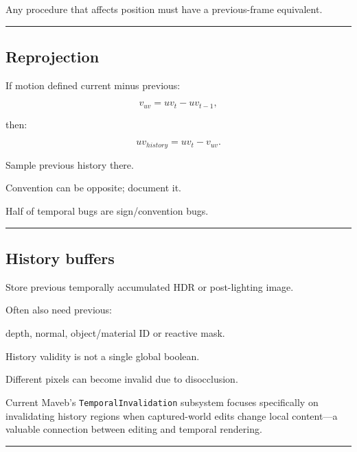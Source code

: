 Any procedure that affects position must have a previous-frame equivalent.

\begin{center}\rule{0.5\linewidth}{0.5pt}\end{center}

\subsection{Reprojection}\label{04-visual-computing-ii-ch040-reprojection}

\hypertarget{04-visual-computing-ii-ch040-reprojection}{}

If motion defined current minus previous:

\[
v_{uv}
=
uv_t-uv_{t-1},
\]

then:

\[
\boxed{
uv_{history}
=
uv_t-v_{uv}.
}
\]

Sample previous history there.

Convention can be opposite; document it.

Half of temporal bugs are sign/convention bugs.

\begin{center}\rule{0.5\linewidth}{0.5pt}\end{center}

\subsection{History buffers}\label{04-visual-computing-ii-ch040-history-buffers}

\hypertarget{04-visual-computing-ii-ch040-history-buffers}{}

Store previous temporally accumulated HDR or post-lighting image.

Often also need previous:

depth, normal, object/material ID or reactive mask.

History validity is not a single global boolean.

Different pixels can become invalid due to disocclusion.

Current Maveb's \texttt{TemporalInvalidation} subsystem focuses specifically on invalidating history regions when captured-world edits change local content---a valuable connection between editing and temporal rendering.

\begin{center}\rule{0.5\linewidth}{0.5pt}\end{center}

